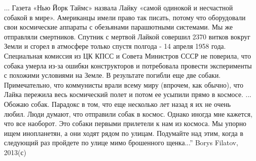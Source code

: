 ...
Газета «Нью Йорк Таймс» назвала Лайку «самой одинокой и несчастной собакой в мире». Американцы имели право так писать, потому что оборудовали свои космические аппараты с обезьянами парашютными системами. Мы же отправляли смертников.
Спутник с мертвой Лайкой совершил 2370 витков вокруг Земли и сгорел в атмосфере только спустя полгода - 14 апреля 1958 года.
Специальная комиссия из ЦК КПСС и Совета Министров СССР не поверила, что собака умерла из-за ошибки конструкторов и потребовала провести эксперименты с похожими условиями на Земле. 
В результате погибли еще две собаки.
Примечательно, что коммунисты врали всему миру (впрочем, как обычно), что Лайка пережила весь космический полет и потом ее усыпили прямо в космосе.
...
Обожаю собак. Парадокс в том, что еще несколько лет назад я их не очень любил.
Люди думают, что отправили собак в космос. Однако иногда мне кажется, что все наоборот. Это собаки первыми прилетели к нам из космоса. Мы упорно ищем инопланетян, а они ходят рядом по улицам.
Подумайте над этим, когда в следующий раз пройдете по улице мимо брошенного щенка...”
Borys Filatov, 2013(с)
\restorecr

